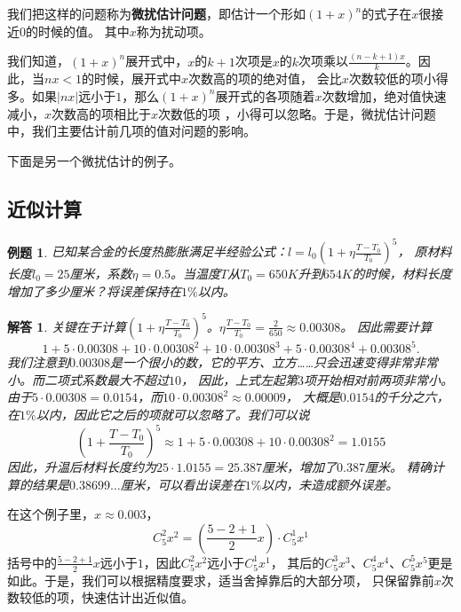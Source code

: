 \documentclass[12pt,UTF8]{ctexbook}
\newtheorem{et}{例题}[section]
\newtheorem*{so}{解答}
\begin{document}
我们把这样的问题称为\textbf{微扰估计问题}，即估计一个形如$(1+x)^n$的式子在$x$很接近$0$的时候的值。
其中$x$称为扰动项。

我们知道，$(1+x)^n$展开式中，$x$的$k+1$次项是$x$的$k$次项乘以$\frac{(n-k+1)x}{k}$。因此，当$nx<1$的时候，展开式中$x$次数高的项的绝对值，
会比$x$次数较低的项小得多。如果$|nx|$远小于$1$，那么$(1+x)^n$展开式的各项随着$x$次数增加，绝对值快速减小，$x$次数高的项相比于$x$次数低的项
，小得可以忽略。于是，微扰估计问题中，我们主要估计前几项的值对问题的影响。

下面是另一个微扰估计的例子。

\subsection{近似计算}
\begin{et}
    已知某合金的长度热膨胀满足半经验公式：$l = l_0(1+\eta\frac{T-T_0}{T_0})^5$，
    原材料长度$l_0=25$厘米，系数$\eta=0.5$。当温度$T$从$T_0=650K$升到$654K$的时候，材料长度增加了多少厘米？将误差保持在$1\%$以内。
\end{et}
\begin{so}
    关键在于计算$(1+\eta\frac{T-T_0}{T_0})^5$。$\eta\frac{T-T_0}{T_0} = \frac{2}{650} \approx 0.00308$。
    因此需要计算
    $$ 1 + 5\cdot 0.00308 + 10\cdot 0.00308^2 + 10 \cdot 0.00308^3 + 5 \cdot 0.00308^4 + 0.00308^5. $$
    我们注意到$0.00308$是一个很小的数，它的平方、立方……只会迅速变得非常非常小。而二项式系数最大不超过$10$，
    因此，上式左起第$3$项开始相对前两项非常小。\\
    由于$5 \cdot 0.00308 = 0.0154$，而$10\cdot 0.00308^2 \approx 0.00009$，
    大概是$0.0154$的千分之六，在$1\%$以内，因此它之后的项就可以忽略了。我们可以说
    $$ (1+\frac{T-T_0}{T_0})^5 \approx 1 + 5\cdot 0.00308 + 10\cdot 0.00308^2 = 1.0155 $$
    因此，升温后材料长度约为$25\cdot 1.0155 = 25.387$厘米，增加了$0.387$厘米。
    精确计算的结果是$0.38699\dots$厘米，可以看出误差在$1\%$以内，未造成额外误差。   
\end{so}

在这个例子里，$x\approx 0.003$，
$$C_5^2x^2 = \left(\frac{5-2+1}{2}x\right)\cdot C_5^1x^1$$
括号中的$\frac{5-2+1}{2}x$远小于$1$，因此$C_5^2x^2$远小于$C_5^1x^1$，
其后的$C_5^3x^3$、$C_5^4x^4$、$C_5^5x^5$更是如此。于是，我们可以根据精度要求，适当舍掉靠后的大部分项，
只保留靠前$x$次数较低的项，快速估计出近似值。
\end{document}
